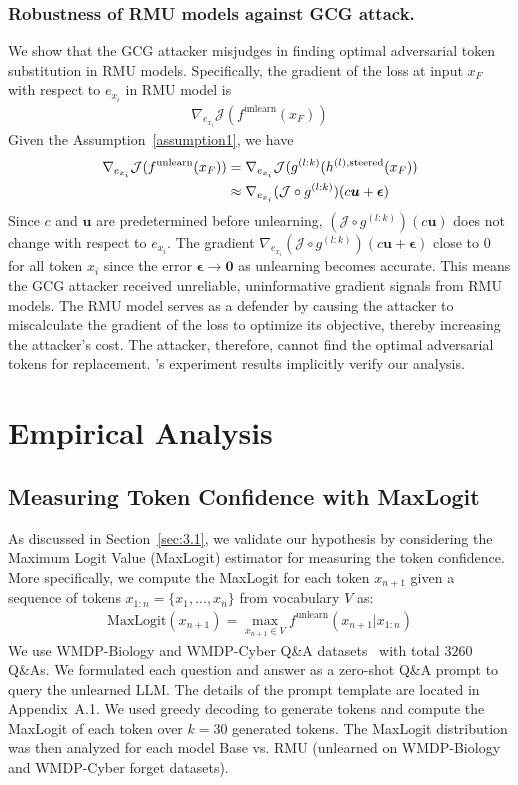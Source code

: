 \documentclass[letterpaper]{article} %
\begin{document}
\subsubsection{Robustness of RMU models against GCG attack.} We show that the GCG attacker misjudges in finding optimal adversarial token substitution in RMU models. Specifically, the gradient of the loss at input $x_F$ with respect to $e_{x_i}$ in RMU model is
\begin{align}
    \nabla_{e_{x_i}}\mathcal{J}(f^{\text{unlearn}}(x_F))
\end{align}
Given the Assumption~\ref{assumption1}, we have
\begin{align}
    \nabla_{e_{x_i}}\mathcal{J}(f^{\text{unlearn}}(x_F)) &= \nabla_{e_{x_i}}\mathcal{J}(g^{(l:k)}(h^{(l),\textnormal{steered}}(x_F)) \nonumber\\&\approx \nabla_{e_{x_i}}(\mathcal{J}\circ g^{(l:k)}) (c\bm u + \bm \epsilon)
\end{align}
Since $c$ and $\bm u$ are predetermined before unlearning, $(\mathcal{J}\circ g^{(l:k)}) (c\bm u)$ does not change with respect to $e_{x_i}$. The gradient $\nabla_{e_{x_i}}(\mathcal{J}\circ g^{(l:k)}) (c\bm u + \bm\epsilon)$ close to $0$ for all token $x_i$ since the error $\bm \epsilon \to \bm 0$ as unlearning becomes accurate. This means the GCG attacker received unreliable, uninformative gradient signals from RMU models. The RMU model serves as a defender by causing the attacker to miscalculate the gradient of the loss to optimize its objective, thereby increasing the attacker’s cost. The attacker, therefore, cannot find the optimal adversarial tokens for replacement. \citet{wmdp}'s experiment results implicitly verify our analysis.

\section{Empirical Analysis}

\subsection{Measuring Token Confidence with MaxLogit}
As discussed in Section~\ref{sec:3.1}, we validate our hypothesis by considering the Maximum Logit Value (MaxLogit) estimator for measuring the token confidence. More specifically, we compute the MaxLogit for each token $x_{n+1}$ given a sequence of tokens $x_{1:n} = \{x_1,...,x_n\}$ from vocabulary $V$ as:
\begin{align}
    \text{MaxLogit}(x_{n+1}) = \max_{x_{n+1} \in V} f^{\text{unlearn}}(x_{n+1}|x_{1:n}) \label{eq21}
\end{align}
We use WMDP-Biology and WMDP-Cyber Q\&A datasets~\cite{wmdp} with total $3260$ Q\&As. We formulated each question and answer as a zero-shot Q\&A prompt to query the unlearned LLM. The details of the prompt template are located in Appendix~A.1. We used greedy decoding to generate tokens and compute the MaxLogit of each token over $k=30$ generated tokens. The MaxLogit distribution was then analyzed for each model Base vs. RMU (unlearned on WMDP-Biology and WMDP-Cyber forget datasets). 
\end{document}
